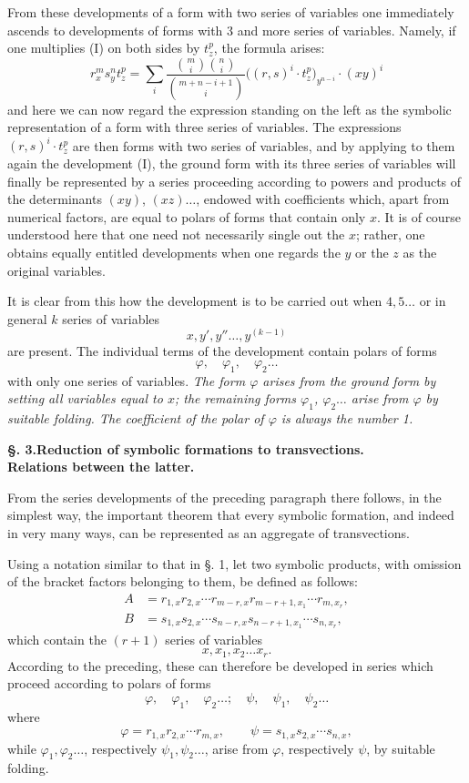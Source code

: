 \documentclass[10pt]{article}
\begin{document}
From these developments of a form with two series of variables one immediately ascends to developments of forms with 3 and more series of variables. Namely, if one multiplies (I) on both sides by $t_z^p$, the formula arises:
\[
r_x^m s_y^n t_z^p
=\sum_i \frac{\binom{m}{i}\binom{n}{i}}{\binom{m+n-i+1}{i}}\bigl((r,s)^i\cdot t_z^p\bigr)_{y^{n-i}}\cdot(xy)^i
\]
and here we can now regard the expression standing on the left as the symbolic representation of a form with three series of variables. The expressions $(r,s)^i\cdot t_z^p$ are then forms with two series of variables, and by applying to them again the development (I), the ground form with its three series of variables will finally be represented by a series proceeding according to powers and products of the determinants $(xy)$, $(xz)\ldots$, endowed with coefficients which, apart from numerical factors, are equal to polars of forms that contain only $x$. It is of course understood here that one need not necessarily single out the $x$; rather, one obtains equally entitled developments when one regards the $y$ or the $z$ as the original variables.

It is clear from this how the development is to be carried out when $4,5\ldots$ or in general $k$ series of variables
\[
x,y',y''\ldots,y^{(k-1)}
\]
are present. The individual terms of the development contain polars of forms
\[
\varphi,\quad \varphi_1,\quad \varphi_2\ldots
\]
with only one series of variables. \emph{The form $\varphi$ arises from the ground form by setting all variables equal to $x$; the remaining forms $\varphi_1$, $\varphi_2\ldots$ arise from $\varphi$ by suitable folding. The coefficient of the polar of $\varphi$ is always the number 1.}

\begin{center}
{\bfseries §. 3.\quad Reduction of symbolic formations to transvections.\\ Relations between the latter.}
\end{center}

From the series developments of the preceding paragraph there follows, in the simplest way, the important theorem that every symbolic formation, and indeed in very many ways, can be represented as an aggregate of transvections.

Using a notation similar to that in §. 1, let two symbolic products, with omission of the bracket factors belonging to them, be defined as follows:
\[
\begin{aligned}
A&=r_{1,x}r_{2,x}\cdots r_{m-r,x}r_{m-r+1,x_1}\cdots r_{m,x_r},\\
B&=s_{1,x}s_{2,x}\cdots s_{n-r,x}s_{n-r+1,x_1}\cdots s_{n,x_r},
\end{aligned}
\]
which contain the $(r+1)$ series of variables
\[
x,x_1,x_2\ldots x_r.
\]
According to the preceding, these can therefore be developed in series which proceed according to polars of forms
\[
\varphi,\quad \varphi_1,\quad \varphi_2\ldots;\quad \psi,\quad \psi_1,\quad \psi_2\ldots
\]
where
\[
\varphi=r_{1,x}r_{2,x}\cdots r_{m,x},\qquad
\psi=s_{1,x}s_{2,x}\cdots s_{n,x},
\]
while $\varphi_1,\varphi_2\ldots$, respectively $\psi_1,\psi_2\ldots$, arise from $\varphi$, respectively $\psi$, by suitable folding.
\end{document}
